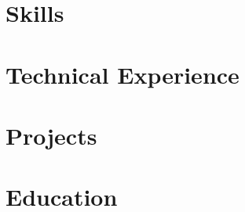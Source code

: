 \documentclass[10pt]{article}
\begin{document}
\pagestyle{others}\thispagestyle{first_page}



\section{Skills}


\section{Technical Experience}


\section{Projects}


\section{Education}


% 
\end{document}

